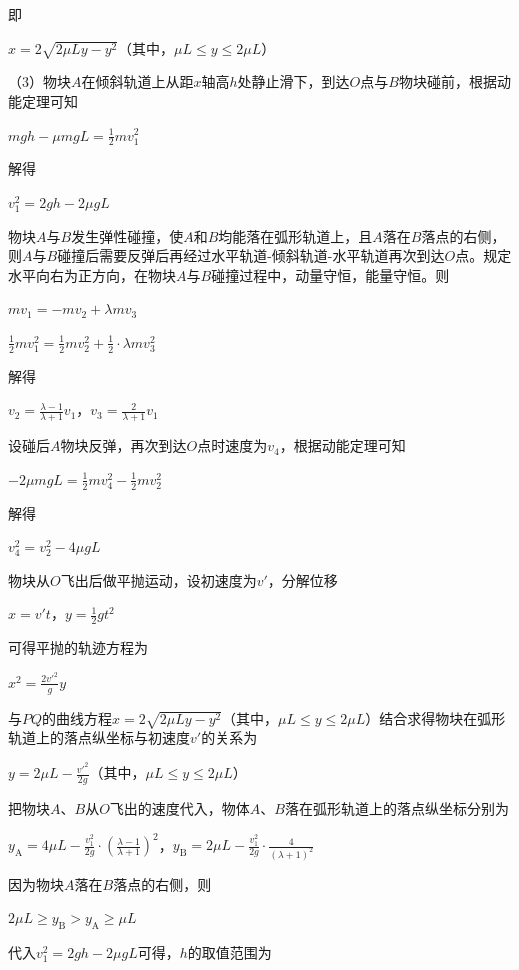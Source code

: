 \documentclass[\gkver]{gaokaozhenti}
\begin{document}
\begin{enumerate}
{	即

	$x=2\sqrt{2\mu Ly-y^{2}}$（其中，$\mu L\leq y\leq2\mu L$）

	（3）物块$A$在倾斜轨道上从距$x$轴高$h$处静止滑下，到达$O$点与$B$物块碰前，根据动能定理可知

	$mgh-\mu mgL=\frac{1}{2}mv_{1}^{2}$

	解得

	$v_{1}^{2}=2gh-2\mu gL$

	物块$A$与$B$发生弹性碰撞，使$A$和$B$均能落在弧形轨道上，且$A$落在$B$落点的右侧，则$A$与$B$碰撞后需要反弹后再经过水平轨道-倾斜轨道-水平轨道再次到达$O$点。规定水平向右为正方向，在物块$A$与$B$碰撞过程中，动量守恒，能量守恒。则

	$m v_{1}=-m v_{2}+\lambda m v_{3}$

	$\frac{1}{2}mv_{1}^{2}=\frac{1}{2}mv_{2}^{2}+\frac{1}{2}\cdot\lambda mv_{3}^{2}$

	解得

	$v_{2}=\frac{\lambda-1}{\lambda+1}v_{1}$，$v_{3}=\frac{2}{\lambda+1}v_{1}$

	设碰后$A$物块反弹，再次到达$O$点时速度为$v_{4}$，根据动能定理可知

	$-2\mu mgL=\frac{1}{2}mv_{4}^{2}-\frac{1}{2}mv_{2}^{2}$

	解得

	$v_{4}^{2}=v_{2}^{2}-4\mu gL$

	物块从$O$飞出后做平抛运动，设初速度为$v'$，分解位移

	$x = v't$，$y = \frac{1}{2}gt^{2}$

	可得平抛的轨迹方程为

	$x^{2}=\frac{2v'^{2}}{g}y$

	与$PQ$的曲线方程$x = 2\sqrt{2\mu L y - y^2}$（其中，$\mu L \leqslant y \leqslant 2\mu L$）结合求得物块在弧形轨道上的落点纵坐标与初速度$v'$的关系为

	$y = 2\mu L - \frac{v'^2}{2g}$（其中，$\mu L \leqslant y \leqslant 2\mu L$）

	把物块$A$、$B$从$O$飞出的速度代入，物体$A$、$B$落在弧形轨道上的落点纵坐标分别为

	$y_{\text{A}} = 4\mu L - \frac{v_{1}^{2}}{2g} \cdot \left(\frac{\lambda - 1}{\lambda + 1}\right)^{2}$，$y_{\text{B}} = 2\mu L - \frac{v_{1}^{2}}{2g} \cdot \frac{4}{(\lambda + 1)^{2}}$

	因为物块$A$落在$B$落点的右侧，则

	$2\mu L \geq y_{\text{B}} > y_{\text{A}} \geq \mu L$

	代入$v_{1}^{2}=2gh-2\mu gL$可得，$h$的取值范围为

}
\end{enumerate}
\end{document}
